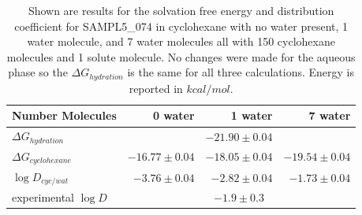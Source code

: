 \begin{table}
\begin{tabular}{| l | r r r |}
\hline
Number Molecules & 0 water & 1 water & 7 water\\
\hline
$\Delta G_{hydration}$ & \multicolumn{3}{|c|}{$ -21.90 \pm 0.04 $} \\ \hline
$\Delta G_{cyclohexane}$ & $ -16.77 \pm 0.04 $ &  $-18.05 \pm 0.04 $ & $ -19.54 \pm 0.04$ \\
$\log D_{cyc/wat}$ & $ -3.76 \pm 0.04 $ & $-2.82 \pm 0.04$ & $ -1.73 \pm 0.04$  \\
\hline
experimental $\log D$ &\multicolumn{3}{|c|}{$-1.9 \pm 0.3 $} \\
\hline
\end{tabular}
\label{waterInCyc}
\caption{Shown are results for the solvation free energy and distribution coefficient for SAMPL5\_074 in cyclohexane with no water present, 1 water molecule, and 7 water molecules all with 150 cyclohexane molecules and 1 solute molecule. No changes were made for the aqueous phase so the $\Delta G_{hydration}$ is the same for all three calculations. Energy is reported in $kcal/mol$. } 
\end{table}
